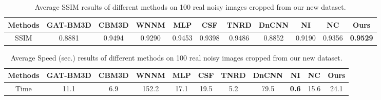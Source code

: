 \begin{table}[htpb]
\begin{adjustwidth}{-1cm}{}
\scriptsize
\caption{Average SSIM \cite{ssim} results of different methods on 100 real noisy images cropped from our new dataset.}
\label{tab3-7}
\begin{center}
\renewcommand\arraystretch{1}
\begin{tabular}{|c||c|c|c|c|c|c|c|c|c|c|}
\hline
Methods
&\textbf{GAT-BM3D}
&\textbf{CBM3D}
&\textbf{WNNM}
&\textbf{MLP}
&\textbf{CSF} 
&\textbf{TNRD} 
&\textbf{DnCNN}
&\textbf{NI} 
&\textbf{NC} 
&\textbf{Ours} 
\\
\hline
SSIM  
& 0.8881 & 0.9494 & 0.9290 & 0.9453 & 0.9398 & 0.9486 & 0.8852 & 0.9190 & 0.9356 & \textbf{0.9529}
\\
\hline
\end{tabular}
\end{center}
\end{adjustwidth}
\end{table}



\begin{table}
\begin{adjustwidth}{-1cm}{}
\scriptsize
\caption{Average Speed (sec.) results of different methods on 100 real noisy images cropped from our new dataset.}

\label{tab3-8}
\begin{center}
\renewcommand\arraystretch{1}
\begin{tabular}{|c||c|c|c|c|c|c|c|c|c|c|}
\hline
Methods
&\textbf{GAT-BM3D}
&\textbf{CBM3D}
&\textbf{WNNM}
&\textbf{MLP}
&\textbf{CSF} 
&\textbf{TNRD} 
&\textbf{DnCNN}
&\textbf{NI} 
&\textbf{NC} 
&\textbf{Ours} 
\\
\hline
Time  
& 11.1 & 6.9 & 152.2 & 17.1 & 19.5 & 5.2 & 79.5 & \textbf{0.6} & 15.6 & 24.1
\\
\hline
\end{tabular}
\end{center}
\end{adjustwidth}
\end{table}


